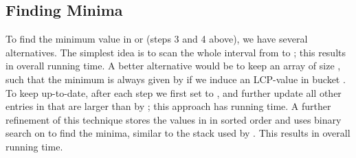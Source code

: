 \documentclass[11pt,onecolumn,final]{article} \usepackage[latin1]{inputenc}
\theoremstyle{plain}
\theoremstyle{remark}
\begin{document}
\subsection{Finding Minima}
\label{sect:rmq}
To find the minimum value in  or  (steps 3 and 4 above), we have several alternatives. The simplest idea is to scan the whole interval from  to ; this results in overall  running time. A better alternative would be to keep an array  of size , such that the minimum is always given by  if we induce an LCP-value in bucket . To keep  up-to-date, after each step  we first set  to , and further update all other entries in  that are larger than  by ; this approach has  running time. A further refinement of this technique stores the values in  in sorted order and uses binary search on  to find the minima, similar to the stack used by \cite{gog11fast}. This results in overall  running time.
\end{document}
